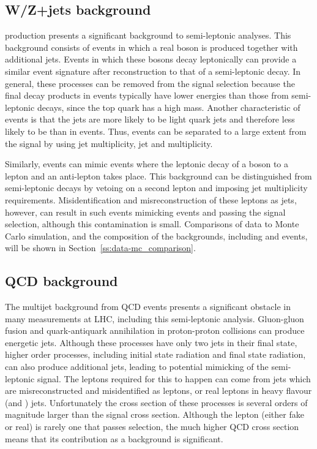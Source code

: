\subsection{W/Z+jets background}
\label{ss:w_z_plus_jets}
\WpJets production presents a significant background to semi-leptonic \ttbar analyses. This background
consists of events in which a real \W boson is produced together with additional jets. Events in which these
\W bosons decay leptonically can provide a similar event signature after reconstruction to that of a
semi-leptonic \ttbar decay. In general, these processes can be removed from the signal selection because the
final decay products in \WpJets events typically have lower energies than those from semi-leptonic \ttbar
decays, since the top quark has a high mass. Another characteristic of \WpJets events is that the jets are
more likely to be light quark jets and therefore less likely to be \bjets than in \ttbar events. Thus, \WpJets
events can be separated to a large extent from the \ttbar signal by using jet multiplicity, jet \pt and \bjet
multiplicity.

Similarly, \ZpJets events can mimic \ttbar events where the leptonic decay of a \Z boson to a lepton and an
anti-lepton takes place. This background can be distinguished from semi-leptonic \ttbar decays by
vetoing on a second lepton and imposing jet multiplicity requirements. Misidentification and misreconstruction
of these leptons as jets, however, can result in such events mimicking \ttbar events and passing the signal
selection, although this contamination is small. Comparisons of data to Monte Carlo simulation, and the
composition of the backgrounds, including \WpJets and \ZpJets events, will be shown in
Section~\ref{ss:data-mc_comparison}.

\subsection{QCD background}
\label{ss:qcd}
The multijet background from QCD events presents a significant obstacle in many measurements at LHC, including
this semi-leptonic \ttbar analysis. Gluon-gluon fusion and quark-antiquark annihilation in proton-proton
collisions can produce energetic jets. Although these processes have only two jets in their final state,
higher order processes, including initial state radiation and final state radiation, can also produce
additional jets, leading to potential mimicking of the semi-leptonic \ttbar signal. The leptons required for
this to happen can come from jets which are misreconstructed and misidentified as leptons, or real leptons in
heavy flavour (\cPqb and \cPqc) jets. Unfortunately the cross section of these processes is several orders of
magnitude larger than the signal cross section. Although the lepton (either fake or real) is rarely one that
passes selection, the much higher QCD cross section means that its contribution as a background is
significant.

